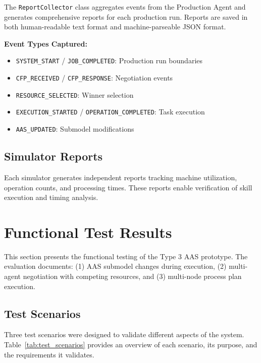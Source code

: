 The \texttt{ReportCollector} class aggregates events from the Production Agent and generates comprehensive reports for each production run. Reports are saved in both human-readable text format and machine-parseable JSON format.

\textbf{Event Types Captured:}
\begin{itemize}
    \item \texttt{SYSTEM\_START} / \texttt{JOB\_COMPLETED}: Production run boundaries
    \item \texttt{CFP\_RECEIVED} / \texttt{CFP\_RESPONSE}: Negotiation events
    \item \texttt{RESOURCE\_SELECTED}: Winner selection
    \item \texttt{EXECUTION\_STARTED} / \texttt{OPERATION\_COMPLETED}: Task execution
    \item \texttt{AAS\_UPDATED}: Submodel modifications
\end{itemize}
\subsection{Simulator Reports}

Each simulator generates independent reports tracking machine utilization, operation counts, and processing times. These reports enable verification of skill execution and timing analysis.
\section{Functional Test Results}
\label{sec:test_results}

This section presents the functional testing of the Type 3 \ac{AAS} prototype. The evaluation documents: (1) \ac{AAS} submodel changes during execution, (2) multi-agent negotiation with competing resources, and (3) multi-node process plan execution.

\subsection{Test Scenarios}
\label{subsec:test_scenarios}

Three test scenarios were designed to validate different aspects of the system. Table~\ref{tab:test_scenarios} provides an overview of each scenario, its purpose, and the requirements it validates.

